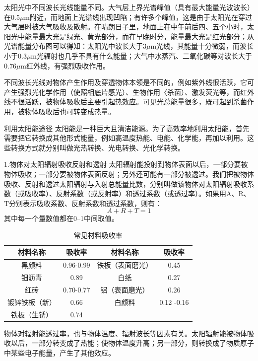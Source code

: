 \documentclass{ctexbook}
\begin{document}
太阳光中不同波长光线能量不同。大气层上界光谱峰值（具有最大能量光波波长）在0.5$\mu$m附近，而地面上光谱线出现凹陷；有许多个峰值，这是由于太阳光在穿过大气层时被大气吸收及散射。在晴朗日子里，地面上在中午前后四、五个小时，太阳光中能量最大光是绿光、黄光部分，而在早晚时分，能量最大光是红光部分；从光谱能量分布图可以得知：太阳光中波长大于3$\mu$m光线，其能量十分微弱，而波长小于0.3$\mu$m光辐射也几乎不具有什么能量；大气中水蒸汽、二氧化碳等对波长大于0.76$\mu$m红外线，有强烈吸收作用。

不同波长光线对物体产生作用及穿透物体本领是不同的，例如紫外线很活跃，它可产生强烈光化学作用（使照相底片感光）、生物作用〈杀菌）、激发荧光等，而红外线不很活跃，被物体吸收后主要引起热效应。可见光总能量很多，既可起到杀菌作用，被物体吸收后也可转变成热量。

利用太阳能途径
太阳能是一种巨大且清洁能源。为了高效率地利用太阳能，首先需要把它转换成其他形式能量，例如高温度热能、电能、化学能，再加以利用。这些转换方式就分别叫做光热转换、光电转换、光化学转换。

1.物体对太阳辐射吸收反射和透射
太阳辐射能投射到物体表面以后，一部分要被物体吸收；一部分要被物体表面反射；另外还可能有一部分被透过。我们把被物体吸收、反射和透过太阳辐射与入射总能量比数，分别叫做该物体对太阳辐射吸收系数（或吸收率）、反射系数（或反射率）和透过系数（或透过率）。如果用A、R、T分别表示吸收系数、反射系数和透过系数，则有：
\begin{equation*}
	A+R+T=1
\end{equation*}
其中每一个量数值都在0--1中间取值。

\begin{table}[htbp]
	\centering
	\caption{常见材料吸收率}
	\begin{tabular}{c|c|c|c}
		\toprule
		材料名称  & 吸收率   & 材料名称  & 吸收率 \\
		\midrule
		黑颜料   & 0.96-0.99 & 铁板（表面磨光） & 0.45 \\
		\midrule
		钿沥青   & 0.89  & 白纸    & 0.27 \\
		\midrule
		红砖    & 0.70-0.77 & 铝（表面磨光） & 0.26 \\
		\midrule
		镀锌铁板（新） & 0.66  & 白颜料   & 0.12 -0.16 \\
		\midrule
		铁板（生锈） & 0.74  &       &  \\
		\bottomrule
	\end{tabular}%
	\label{tab:xishou}%
\end{table}%


物体对辐射能透过率，也与物体温度、辐射波长等因素有关。太阳辐射能被物体吸收以后，一部分转变成了热能；使物体温度升高；另一部分，则转换成了物质原子中某些电子能量，产生了其他效应。
\end{document}
